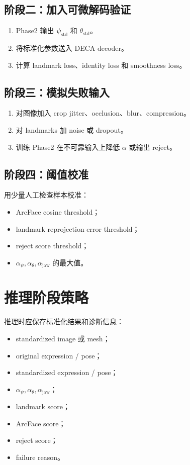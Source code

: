 \documentclass[UTF8,12pt,fontset=fandol]{ctexart}
\begin{document}
\subsection{阶段二：加入可微解码验证}

\begin{enumerate}
    \item Phase2 输出 \(\psi_{\text{std}}\) 和 \(\theta_{\text{std}}\)。
    \item 将标准化参数送入 DECA decoder。
    \item 计算 landmark loss、identity loss 和 smoothness loss。
\end{enumerate}

\subsection{阶段三：模拟失败输入}

\begin{enumerate}
    \item 对图像加入 crop jitter、occlusion、blur、compression。
    \item 对 landmarks 加 noise 或 dropout。
    \item 训练 Phase2 在不可靠输入上降低 \(\alpha\) 或输出 reject。
\end{enumerate}

\subsection{阶段四：阈值校准}

用少量人工检查样本校准：

\begin{itemize}
    \item ArcFace cosine threshold；
    \item landmark reprojection error threshold；
    \item reject score threshold；
    \item \(\alpha_{\psi}, \alpha_{\theta}, \alpha_{\text{jaw}}\) 的最大值。
\end{itemize}

\section{推理阶段策略}

推理时应保存标准化结果和诊断信息：

\begin{itemize}
    \item standardized image 或 mesh；
    \item original expression / pose；
    \item standardized expression / pose；
    \item \(\alpha_{\psi}, \alpha_{\theta}, \alpha_{\text{jaw}}\)；
    \item landmark score；
    \item ArcFace score；
    \item reject score；
    \item failure reason。
\end{itemize}
\end{document}
